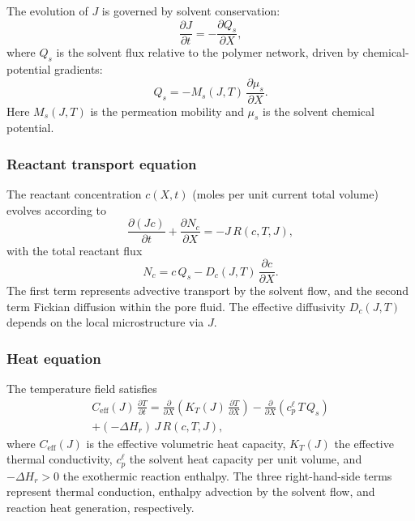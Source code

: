 \documentclass[aps,pre,reprint,superscriptaddress,longbibliography,floatfix]{revtex4-2}
\begin{document}
The evolution of $J$ is governed by solvent conservation:
\begin{equation}
  \frac{\partial J}{\partial t} = -\frac{\partial Q_s}{\partial X},
  \label{eq:J_evol}
\end{equation}
where $Q_s$ is the solvent flux relative to the polymer network, driven by chemical-potential gradients:
\begin{equation}
  Q_s = -M_s(J,T)\,\frac{\partial \mu_s}{\partial X}.
  \label{eq:Qs}
\end{equation}
Here $M_s(J,T)$ is the permeation mobility and $\mu_s$ is the solvent chemical potential.

\subsubsection{Reactant transport equation}

The reactant concentration $c(X,t)$ (moles per unit current total volume) evolves according to
\begin{equation}
  \frac{\partial (Jc)}{\partial t}
  + \frac{\partial N_c}{\partial X}
  = -J\,R(c,T,J),
  \label{eq:c_evol}
\end{equation}
with the total reactant flux
\begin{equation}
  N_c = c\,Q_s - D_c(J,T)\,\frac{\partial c}{\partial X}.
  \label{eq:Nc}
\end{equation}
The first term represents advective transport by the solvent flow, and the second term Fickian diffusion within the pore fluid. The effective diffusivity $D_c(J,T)$ depends on the local microstructure via $J$.

\subsubsection{Heat equation}

The temperature field satisfies
\begin{multline}
  C_\mathrm{eff}(J)\,\frac{\partial T}{\partial t}
  = \frac{\partial}{\partial X}\!\left(K_T(J)\,\frac{\partial T}{\partial X}\right)
  - \frac{\partial}{\partial X}\!\left(c_p^\ell\,T\,Q_s\right)
  \\
  + (-\Delta H_r)\,J\,R(c,T,J),
  \label{eq:T_evol}
\end{multline}
where $C_\mathrm{eff}(J)$ is the effective volumetric heat capacity,
$K_T(J)$ the effective thermal conductivity, $c_p^\ell$ the solvent
heat capacity per unit volume, and $-\Delta H_r > 0$ the exothermic
reaction enthalpy.  The three right-hand-side terms represent thermal
conduction, enthalpy advection by the solvent flow, and reaction heat
generation, respectively.
\end{document}
